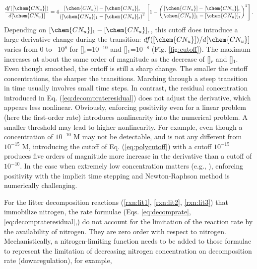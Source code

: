 \documentclass[gmd, manuscript]{copernicus}
\begin{document}
\begin{equation}
\frac{d f([\chem{CN_u} ])}{d[\chem{CN_u}]}=4 \frac{[\chem{CN_u}] -
[\chem{CN_u}]_\text{r}}{\left([\chem{CN_u}]_1 - [\chem{CN_u}]_\text{r} \right)^2}
\left[1-\left(\frac{[\chem{CN_u}]-[\chem{CN_u} ]_\text{r}}{\chem{CN_u}
]_1-[\chem{CN_u} ]_\text{r}}\right)^2 \right].
\label{eq:polycutoffderiv}
\end{equation}
Depending on $[\chem{CN_u}]_1-[\chem{CN_u}]_\text{r}$, this cutoff does
introduce a large derivative change during the transition:
$df([\chem{CN_u}])/d[\chem{CN_u}]$ varies from 0 to ~10$^8$ for
[]$_\text{r}$=10$^{-10}$  and []$_1$=10$^{-8}$ (Fig.
\ref{fig:cutoff}). The maximum increases at about the same order of magnitude
as the decrease of []$_r$ and []$_1$. Even though
smoothed, the cutoff is still a sharp change. The smaller the cutoff
concentrations, the sharper the transitions. Marching through a steep
transition in time usually involves small time steps. In contrast, the residual
concentration introduced in Eq. (\ref{eq:decomprateresidual}) does not adjust
the derivative, which appears less nonlinear.
Obviously, enforcing positivity even for a linear problem (here the first-order
rate) introduces nonlinearity into the numerical problem. A smaller threshold
may lead to higher nonlinearity. For example, even though a 
concentration of  $10^{-10}$ \unit{M} may not be detectable, and is not any
different from $10^{-15}$ \unit{M}, introducing the cutoff of
Eq. (\ref{eq:polycutoff}) with a cutoff $10^{-15}$ produces five orders of
magnitude more increase in the derivative than a cutoff of $10^{-10}$. In the case when
extremely low concentration matters (e.g., ), enforcing positivity
with the implicit time stepping and Newton-Raphson method is numerically
challenging.

For the litter decomposition reactions (\ref{rxn:lit1}, \ref{rxn:lit2},
\ref{rxn:lit3}) that immobilize nitrogen, the rate formulae (Eqs.
\ref{eq:decomprate}, \ref{eq:decomprateresidual},) do not account for the
limitation of the reaction rate by the availability of nitrogen. They are zero
order with respect to nitrogen. Mechanistically, a nitrogen-limiting function
needs to be added to those formulae to represent the limitation of decreasing
nitrogen concentration on decomposition rate (downregulation), for example, 
\end{document}
